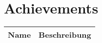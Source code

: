 \section{Achievements}

%


\begin{table}[ht]
  \caption{Achievements}
  \small
  \begin{longtabu}{X[-1]X}
    \toprule\rowfont{\itshape}
    Name & Beschreibung \\
    \midrule\endhead


\end{longtabu}
\end{table}
